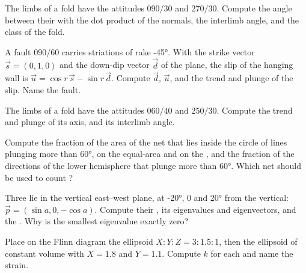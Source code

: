\begin{exercise}[$\star$]\label{exo:b3:structural-analysis:3}
The limbs of a fold have the attitudes $090/30$ and $270/30$. Compute the
angle between their  with the dot product of the normals, the interlimb
angle, and the class of the fold.
\end{exercise}

\begin{exercise}[$\star$]\label{exo:b3:structural-analysis:4}
A fault $090/60$ carries striations of rake \ang{-45}. With the strike vector
$\vec s = (0, 1, 0)$ and the down-dip vector $\vec d$ of the plane, the slip
of the hanging wall is $\vec u = \cos r\,\vec s - \sin r\,\vec d$. Compute
$\vec d$, $\vec u$, and the trend and plunge of the slip. Name the fault.
\end{exercise}

\begin{exercise}[$\star\star$]\label{exo:b3:structural-analysis:5}
The limbs of a fold have the attitudes $060/40$ and $250/30$. Compute the
trend and plunge of its axis, and its interlimb angle.
\end{exercise}

\begin{exercise}[$\star\star$]\label{exo:b3:structural-analysis:6}
Compute the fraction of the area of the net that lies inside the circle of
lines plunging more than \ang{60}, on the equal-area and on the , and the fraction of the directions of the lower hemisphere that plunge
more than \ang{60}. Which net should be used to count ?
\end{exercise}

\begin{exercise}[$\star\star$]\label{exo:b3:structural-analysis:7}
Three  lie in the vertical east--west plane, at \ang{-20}, $0$ and
\ang{20} from the vertical: $\vec p = (\sin a, 0, -\cos a)$. Compute their
, its eigenvalues and eigenvectors, and the . Why
is the smallest eigenvalue exactly zero?
\end{exercise}

\begin{exercise}[$\star\star$]\label{exo:b3:structural-analysis:8}
Place on the Flinn diagram the ellipsoid $X : Y : Z = 3 : 1.5 : 1$, then the
ellipsoid of constant volume with $X = 1.8$ and $Y = 1.1$. Compute $k$ for
each and name the strain.
\end{exercise}

